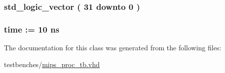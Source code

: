 \hypertarget{classmips__proc__tb_1_1behavior_a9ab65ec266e93aca6fc7f8ce688f92bf}{
\subsubsection[{pca\-\_\-o}]{ {\bfseries std\-\_\-logic\-\_\-vector (   31    downto    0  ) } }}\label{classmips__proc__tb_1_1behavior_a9ab65ec266e93aca6fc7f8ce688f92bf}
\hypertarget{classmips__proc__tb_1_1behavior_a5f1272460f402ee58f04009a62af525e}{
\subsubsection[{clk\-\_\-period}]{ {\bfseries time  \-:=  10  ns } }}\label{classmips__proc__tb_1_1behavior_a5f1272460f402ee58f04009a62af525e}


\-The documentation for this class was generated from the following files\-:\begin{DoxyCompactItemize}
\item 
testbenches/\hyperlink{mips__proc__tb_8vhd}{mips\-\_\-proc\-\_\-tb.\-vhd}\end{DoxyCompactItemize}
